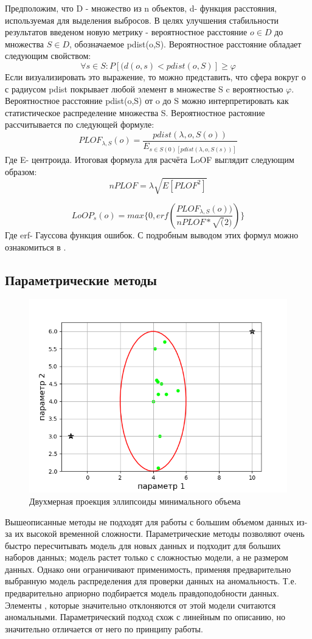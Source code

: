  Предположим, что D - множество из n объектов, d- функция расстояния, используемая для выделения выбросов. В целях улучшения стабильности результатов введеном новую метрику - вероятностное расстояние 
 $o \in D$ до  множества $S \in D$, обозначаемое pdist(o,S).
 Вероятностное расстояние обладает следующим свойством:
 \begin{equation}
 \forall s \in S : P[(d(o,s)<pdist(o,S)] \geq \varphi
 \end{equation}
 Если визуализировать это выражение, то можно представить, что сфера вокруг о с радиусом pdist покрывает любой элемент в множестве S c вероятностью $\varphi$. Вероятностное расстояние pdist(o,S) от o до S можно интерпретировать как статистическое распределение множества S. 
 Вероятностное растояние рассчитывается по следующей формуле:
 \begin{equation}
 PLOF_{\lambda,S}(o)=\frac{pdist(\lambda,o, S(o))}{E_{s \in S(0)[pdist(\lambda,o, S(s))]}}
 \end{equation}
 Где E- центроида.
 Итоговая формула для расчёта LoOF выглядит следующим образом:
 \begin{equation}
 nPLOF=\lambda\sqrt{E[PLOF^2]}
 \end{equation}

  \begin{equation}
  LoOP_s(o)=max\{0,erf(\frac{PLOF_{\lambda,S}(o))}{nPLOF*\sqrt(2)})\}
  \end{equation}
 Где erf- Гауссова функция ошибок.
 С подробным выводом этих формул можно ознакомиться в \cite{Book18}.
\subsection{Параметрические методы}
\begin{figure}[!h]
	\centering
	\includegraphics[width=.5\textwidth]{img/4_1.png}
	\caption{Двухмерная проекция эллипсоиды минимального объема}
	\label{fig04}
\end{figure}
Вышеописанные методы не подходят для работы с большим объемом данных из-за их высокой временной сложности.
Параметрические методы позволяют очень быстро пересчитывать модель для
новых данных и подходит для больших наборов данных; модель растет
только с сложностью модели, а не размером данных. Однако они ограничивают
применимость,  применяя предварительно выбранную модель распределения для проверки данных на аномальность. Т.е. предварительно априорно подбирается модель правдоподобности данных. Элементы , которые значительно отклоняются от этой модели считаются аномальными. Параметрический подход схож с линейным по описанию, но значительно отличается от него по принципу работы.

